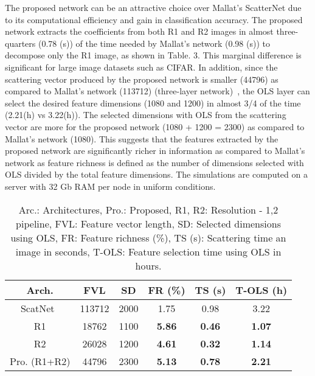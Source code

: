 \documentclass{article}
\begin{document}
The proposed network can be an attractive choice over Mallat's ScatterNet due to its computational efficiency and gain in classification accuracy. The proposed network extracts the coefficients from both R1 and R2 images in almost three-quarters (0.78 (s)) of the time needed by Mallat's network (0.98 (s)) to decompose only the R1 image, as shown in Table. 3. This marginal difference is significant for large image datasets such as CIFAR. In addition, since the scattering vector produced by the proposed network is smaller (44796) as compared to Mallat's network (113712) (three-layer network)~\cite{Oyallon2015}, the OLS layer can select the desired feature dimensions (1080 and 1200) in almost 3/4 of the time (2.21(h) vs 3.22(h)). The selected dimensions with OLS from the scattering vector are more for the proposed network (1080 + 1200 = 2300) as compared to Mallat's network (1080). This suggests that the features extracted by the proposed network are significantly richer in information as compared to Mallat's network as feature richness is defined as the number of dimensions selected with OLS divided by the total feature dimensions. The simulations are computed on a server with 32 Gb RAM per node in uniform conditions. \vspace{-5mm}

\begin{table}[!h]
\centering
\caption{\small{Arc.: Architectures, Pro.: Proposed, R1, R2: Resolution - 1,2  pipeline, FVL: Feature vector length, SD: Selected dimensions using OLS, FR: Feature richness (\%), TS (s): Scattering time an image in seconds, T-OLS: Feature selection time using OLS in hours.}}
\label{MNIST}
\begin{tabular}{c|ccccc}
\hline
\small{Arch.} & \small{FVL} & \small{SD} & \small{FR (\%)} & \small{TS (s)} & \small{T-OLS (h)}\\
 \hline
\small{ScatNet~\cite{Oyallon2015}}  & \small{113712} & \small{2000} & \small{1.75} & \small{0.98} & \small{3.22}\\
\small{R1} & \small{18762} & \small{1100} & \textbf{\small{5.86}} & \textbf{\small{0.46}} & \textbf{\small{1.07}}\\
\small{R2} & \small{26028} & \small{1200} & \textbf{\small{4.61}} & \textbf{\small{0.32}} & \textbf{\small{1.14}}\\ \hline
\small{Pro. (R1+R2)} & \small{44796} & \small{2300} & \textbf{\small{5.13}} & \textbf{\small{0.78}} & \textbf{\small{2.21}}\\
\end{tabular}
\end{table}
\vspace{-3mm}
\end{document}

